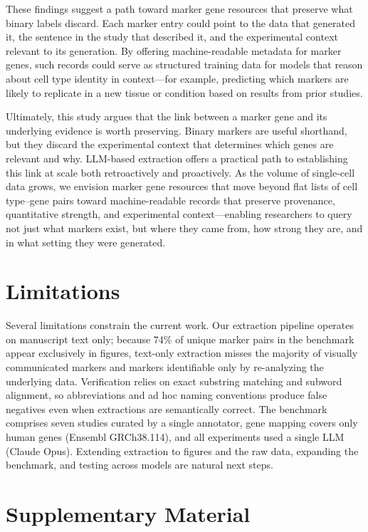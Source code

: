 \documentclass[10pt,twocolumn]{article}
\theoremstyle{plain}
\theoremstyle{definition}
\theoremstyle{remark}
\begin{document}
These findings suggest a path toward marker gene resources that preserve what binary labels discard. Each marker entry could point to the data that generated it, the sentence in the study that described it, and the experimental context relevant to its generation. By offering machine-readable metadata for marker genes, such records could serve as structured training data for models that reason about cell type identity in context---for example, predicting which markers are likely to replicate in a new tissue or condition based on results from prior studies.

Ultimately, this study argues that the link between a marker gene and its underlying evidence is worth preserving. Binary markers are useful shorthand, but they discard the experimental context that determines which genes are relevant and why. LLM-based extraction offers a practical path to establishing this link at scale both retroactively and proactively. As the volume of single-cell data grows, we envision marker gene resources that move beyond flat lists of cell type--gene pairs toward machine-readable records that preserve provenance, quantitative strength, and experimental context---enabling researchers to query not just what markers exist, but where they came from, how strong they are, and in what setting they were generated.

\section{Limitations}
Several limitations constrain the current work. Our extraction pipeline operates on manuscript text only; because 74\% of unique marker pairs in the benchmark appear exclusively in figures, text-only extraction misses the majority of visually communicated markers and markers identifiable only by re-analyzing the underlying data. Verification relies on exact substring matching and subword alignment, so abbreviations and ad hoc naming conventions produce false negatives even when extractions are semantically correct. The benchmark comprises seven studies curated by a single annotator, gene mapping covers only human genes (Ensembl GRCh38.114), and all experiments used a single LLM (Claude Opus). Extending extraction to figures and the raw data, expanding the benchmark, and testing across models are natural next steps.

\clearpage
\newpage
\onecolumn
\appendix

\section{Supplementary Material}
\end{document}
